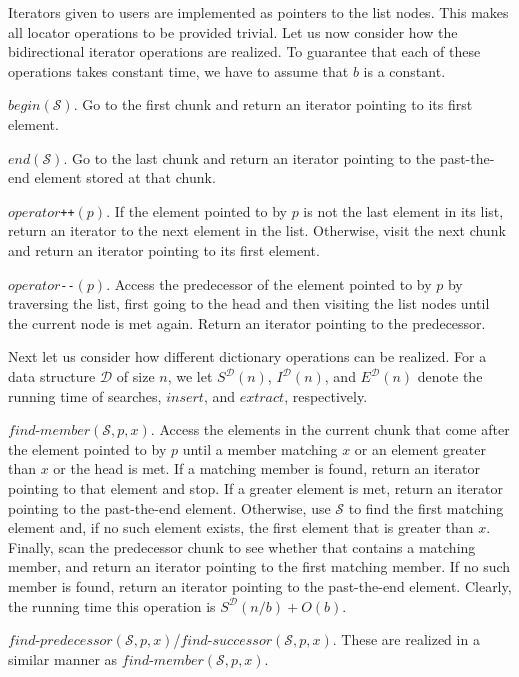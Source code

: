 \documentclass{DIKU-article}
\newcommand{\Member}{\mbox{$\mathit{find}$\textnormal{-}}\allowbreak{}\mbox{$\mathit{member}$}}
\newcommand{\Predecessor}{\mbox{$\mathit{find}$\textnormal{-}}\allowbreak{}\mbox{$\mathit{predecessor}$}}
\newcommand{\Successor}{\mbox{$\mathit{find}$\textnormal{-}}\allowbreak{}\mbox{$\mathit{successor}$}}
\newcommand{\Insert}{\mbox{$\mathit{insert}$}}
\newcommand{\Extract}{\mbox{$\mathit{extract}$}}
\newcommand{\Begin}{\mbox{$\mathit{begin}$}}
\newcommand{\End}{\mbox{$\mathit{end}$}}
\newcommand{\Operator}{\mbox{$\mathit{operator}$}}
\begin{document}
Iterators given to users are implemented as pointers to the list
nodes. This makes all locator operations to be provided trivial.  Let
us now consider how the bidirectional iterator operations are
realized. To guarantee that each of these operations takes constant
time, we have to assume that $b$ is a constant.

\Begin{}$(\mathcal{S})$. Go to the first chunk and return an iterator
pointing to its first element.

\End{}$(\mathcal{S})$. Go to the last chunk and return an iterator
pointing to the past-the-end element stored at that chunk.

\Operator{}\texttt{++}$(p)$. If the element pointed to by $p$ is not
the last element in its list, return an iterator to the next element
in the list. Otherwise, visit the next chunk and return an iterator
pointing to its first element.

\Operator{}\texttt{-}\texttt{-}$(p)$. Access the predecessor of the
element pointed to by $p$ by traversing the list, first going to the
head and then visiting the list nodes until the current node is
met again. Return an iterator pointing to the predecessor.

Next let us consider how different dictionary operations can be
realized.  For a data structure $\mathcal{D}$ of size $n$, we let
$S^{\mathcal{D}}(n)$, $I^{\mathcal{D}}(n)$, and $E^{\mathcal{D}}(n)$
denote the running time of searches, \Insert{}, and \Extract{},
respectively.

\Member{}$(\mathcal{S}, p, x)$.  Access the elements in the current
chunk that come after the element pointed to by $p$ until a member
matching $x$ or an element greater than $x$ or the head is met. If a
matching member is found, return an iterator pointing to that element
and stop. If a greater element is met, return an iterator pointing to
the past-the-end element. Otherwise, use $\mathcal{S}$ to find the
first matching element and, if no such element exists, the first
element that is greater than $x$. Finally, scan the predecessor chunk
to see whether that contains a matching member, and return an iterator
pointing to the first matching member. If no such member is found,
return an iterator pointing to the past-the-end element.  Clearly, the
running time this operation is $S^{\mathcal{D}}(n/b) + O(b)$.

\Predecessor{}$(\mathcal{S}, p, x)$/\Successor{}$(\mathcal{S}, p, x)$.
These are realized in a similar manner as \Member$(\mathcal{S}, p,
x)$.
\end{document}
